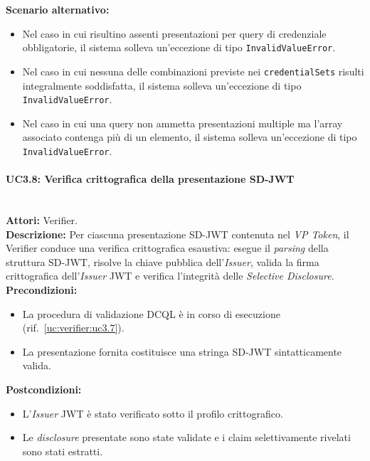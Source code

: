 \noindent\textbf{Scenario alternativo:}
\begin{itemize}
    \item Nel caso in cui risultino assenti presentazioni per query di credenziale obbligatorie, il sistema solleva un'eccezione di tipo \texttt{InvalidValueError}.
    \item Nel caso in cui nessuna delle combinazioni previste nei \texttt{credentialSets} risulti integralmente soddisfatta, il sistema solleva un'eccezione di tipo \texttt{InvalidValueError}.
    \item Nel caso in cui una query non ammetta presentazioni multiple ma l'array associato contenga più di un elemento, il sistema solleva un'eccezione di tipo \texttt{InvalidValueError}.
\end{itemize}

\paragraph{\large\bfseries UC3.8: Verifica crittografica della presentazione SD-JWT}
\label{uc:verifier:uc3.8}
\mbox{}\\
\noindent\textbf{Attori:} Verifier.
\\
\noindent\textbf{Descrizione:} Per ciascuna presentazione SD-JWT contenuta nel \textit{VP Token}, il Verifier conduce una verifica crittografica esaustiva: esegue il \textit{parsing} della struttura SD-JWT, risolve la chiave pubblica dell'\textit{Issuer}, valida la firma crittografica dell'\textit{Issuer} JWT e verifica l'integrità delle \textit{Selective Disclosure}.
\\
\noindent\textbf{Precondizioni:}
\begin{itemize}
    \item La procedura di validazione DCQL è in corso di esecuzione (rif.\ \ref{uc:verifier:uc3.7}).
    \item La presentazione fornita costituisce una stringa SD-JWT sintatticamente valida.
\end{itemize}
\noindent\textbf{Postcondizioni:}
\begin{itemize}
    \item L'\textit{Issuer} JWT è stato verificato sotto il profilo crittografico.
    \item Le \textit{disclosure} presentate sono state validate e i claim selettivamente rivelati sono stati estratti.
\end{itemize}

